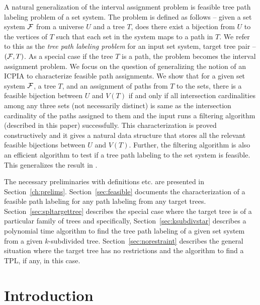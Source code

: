 \documentclass[MS]             %
              {iitmdiss_as}    %
\begin{document}
A natural generalization of the interval
assignment problem is feasible tree path labeling problem of a set
system. The problem is defined as follows -- given a set system ${\cal F}$
from a universe $U$ and a tree $T$, does there exist a bijection from
$U$ to the vertices of $T$ such that each set in the system maps to a
path in $T$.  We refer to this as the {\em tree path labeling problem}
for an input set system, target tree pair -- $({\cal F},T)$. As a special
case if the tree $T$ is a path, the problem becomes the interval
assignment problem.  We focus on the question of generalizing the
notion of an ICPIA \cite{nsnrs09} to characterize feasible path
assignments.  We show that for a given set system ${\cal F}$, a tree $T$,
and an assignment of paths from $T$ to the sets, there is a feasible
bijection between $U$ and $V(T)$ if and only if all intersection
cardinalities among any three sets (not necessarily distinct) is same
as the intersection cardinality of the paths assigned to them and the
input runs a filtering algorithm (described in this paper)
successfully.  This characterization is proved constructively and it
gives a natural data structure that stores all the relevant feasible
bijections between $U$ and $V(T)$.  Further, the filtering algorithm
is also an efficient algorithm to test if a tree path labeling to the
set system is feasible.  This generalizes the result in
\cite{nsnrs09}.

The necessary preliminaries with definitions
etc. are presented in
Section~\ref{ch:prelims}. Section~\ref{sec:feasible} documents the
characterization of a feasible path labeling for any path
labeling from any target trees. Section~\ref{sec:spltargettree}
describes the special case where the target tree is of a particular
family of trees and specifically,
Section~\ref{sec:ksubdivstar} describes a polynomial time algorithm to
find the tree path labeling of a given set system from a given
$k$-subdivided tree. Section~\ref{sec:norestraint} describes the
general situation where the target tree has no restrictions and the
algorithm to find a TPL, if  any, in this case.

\section{Introduction} 
\end{document}
